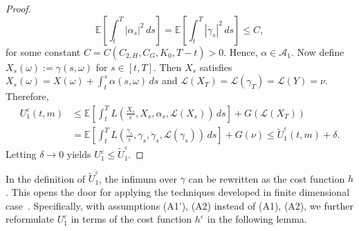 \documentclass[reqno,11pt]{amsart}
\numberwithin{equation}{section}
\newcommand{\e}{\varepsilon}
\newcommand{\ep}{\varepsilon}
\newcommand{\nd}{\noindent}
\begin{document}
\begin{proof}
\[
\mathbb{E}\left[\int_{t}^T\left|\alpha_s\right|^2 \,ds\right]=\mathbb{E}\left[\int_{t}^T\left|\dot{\gamma}_s\right|^2\,
ds \right]\leq C,
\]
for some constant $C=C(C_{2,H}, C_G, K_0, T-t)>0$. Hence, $\alpha \in \mathcal{A}_1$. Now define $X_s(\omega):=\gamma (s, \omega)$ for $s \in [t,T]$. Then $X_s$ satisfies $X_s(\omega)=X(\omega) + \int_t^s\alpha(s,\omega)\,ds$ and $\mathcal{L}(X_T)= \mathcal{L}(\gamma_T)=\mathcal{L}(Y)=\nu$. Therefore,
\[
\begin{aligned}
U^\e_1(t, m) &\leq  \mathbb{E}\left[\int^T_{t}L\left(\frac{X_s}{\varepsilon},X_s,\alpha_s, \mathcal{L}(X_s)\right)\, ds \right]+G(\mathcal{L}(X_T))\\
&=\mathbb{E}\left[
\int_{t}^T
L\left(
\frac{\gamma_s}{\e},
\gamma_s,
\dot{\gamma}_s,
\mathcal{L}(\gamma_s)
\right)\, ds
\right] +G(\nu) \leq \tilde{U}_1^\ep(t, m)+\delta.
\end{aligned}
\]
Letting $\delta \to 0$ yields $U_1^\ep\leq \tilde{U}_1^\ep$.
\end{proof}

\nd
In the definition of $\tilde{U}^\e_1$, the infimum over $\gamma$ can be rewritten as the cost function $h$. This opens the door for applying the techniques developed in finite dimensional case~\cite{TranYu2021}. Specifically, with assumptions (A1'), (A2) instead of (A1), (A2), we further reformulate $U_1^\e$ in terms of the cost function $h^\ep$ in the following lemma.
\end{document}
